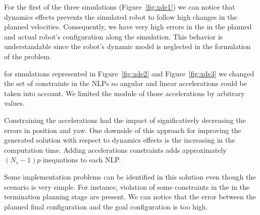 For the first of the three simulations (Figure~\ref{fig:xde1}) we can notice that dynamics effects prevents the simulated robot to follow high changes in the planned velocities. Consequently, we have very high errors in the in the planned and actual robot's configuration along the simulation. This behavior is understandable since the robot's dynamic model is neglected in the formulation of the problem.

for simulations represented in Figure~\ref{fig:xde2} and Figure~\ref{fig:xde3} we changed the set of constraints in the NLPs so angular and linear accelerations could be taken into account. We limited the module of those accelerations by arbitrary values.

Constraining the accelerations had the impact of significatively decreasing the errors in position and yaw. One downside of this approach for improving the generated solution with respect to dynamics effects is the increasing in the computation time. Adding accelerations constraints adds approximately $(N_s-1)p$ inequations to each NLP.

Some implementation problems can be identified in this solution even though the scenario is very simple. For instance, violation of some constraints in the in the termination planning stage are present. We can notice that the error between the planned final configuration and the goal configuration is too high.


%
%
%



